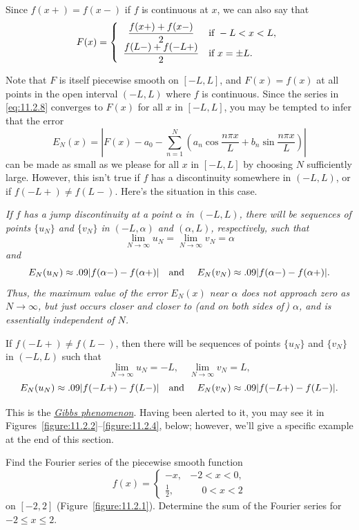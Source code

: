 Since $f(x+)=f(x-)$ if $f$ is continuous at $x$, we can also say that
\[
  F(x)= \left\{
  \begin{array}{cl}
    \displaystyle\frac{f(x+)+f(x-)}{2}  & \mbox{if }-L<x<L,  \\
    \displaystyle\frac{f(L-)+f(-L+)}{2} & \mbox{if }x=\pm L.
  \end{array}\right.
\]

Note that $F$ is itself piecewise smooth on $[-L,L]$, and $F(x)=f(x)$ at all points in the open
interval $(-L,L)$ where $f$ is continuous. Since the series in \eqref{eq:11.2.8} converges to $F(x)$
for all $x$ in $[-L,L]$, you may be tempted to infer that the error
\[
  E_{N}(x)= \left|F(x)-a_{0}-\sum_{n=1}^{N}\left(a_{n}\cos\frac{n\pi x}{L}+b_{n}\sin\frac{n\pi x}{L}\right)\right|
\]
can be made as small as we please for all $x$ in $[-L,L]$ by choosing $N$ sufficiently large.
However, this isn't true if $f$ has a discontinuity somewhere in $(-L,L)$, or if $f(-L+)\ne f(L-)$.
Here's the situation in this case.

{\color{blue}\it If $f$ has a jump discontinuity at a point $\alpha$ in $(-L,L)$, there will be
sequences of points $\{u_{N}\}$ and $\{v_{N}\}$ in $(-L,\alpha)$ and $(\alpha,L)$, respectively,
such that \[\lim_{N\to\infty}u_{N}= \lim_{N\to\infty}v_{N}=\alpha\]
and \[E_{N}(u_{N})\approx.09|f(\alpha-)-f(\alpha+)|\mbox{\quad and \quad}E_{N}(v_{N})\approx.09|f(\alpha-)-f(\alpha+)|.\]
Thus, the maximum value of the error $E_{N}(x)$ near $\alpha$ does not approach zero as
$N\to\infty$, but just occurs closer and closer to (and on both sides of\,) $\alpha$, and is
essentially independent of $N$.

If $f(-L+)\ne f(L-)$, then there will be sequences of points $\{u_{N}\}$ and $\{v_{N}\}$ in $(-L,L)$
such that \[\lim_{N\to\infty}u_{N}=-L,\quad
\lim_{N\to\infty}v_{N}=L,\] \[E_{N}(u_{N})\approx.09|f(-L+)-f(L-)|\mbox{\quad and \quad}E_{N}(v_{N})\approx.09|f(-L+)-f(L-)|.\]}

This is the \href{https://mathshistory.st-andrews.ac.uk/Biographies/Gibbs/}{\color{blue}
\it Gibbs phenomenon\/}. Having been alerted to it, you may see it in
Figures~\ref{figure:11.2.2}--\ref{figure:11.2.4}, below; however, we'll give a specific example at
the end of this section.

\begin{example}
  \label{example:11.2.1} \rm Find the Fourier series of the piecewise smooth function
  \[
    f(x)= \left\{
    \begin{array}{rlr}
      -x,          & -2<x<0,          \\
      \frac{1}{2}, & \phantom{-}0<x<2
    \end{array}\right.
  \]
  on $[-2,2]$ (Figure~\ref{figure:11.2.1}). Determine the sum of the Fourier series for
  $-2\le x\le2$.
\end{example}

